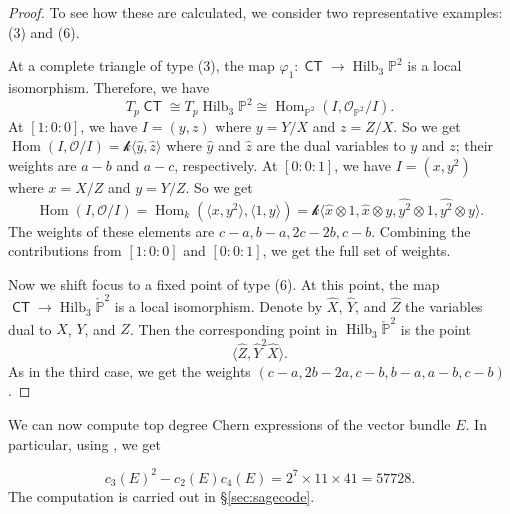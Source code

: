 \documentclass{article}
\renewcommand{\P}{\mathbb{P}}
\renewcommand{\k}{\mathscr{k}}
\DeclareMathOperator{\Hom}{Hom}
\DeclareMathOperator{\Hilb}{Hilb}
\renewcommand{\O}{\mathcal{O}}
\DeclareMathOperator{\CT}{\mathsf{CT}}
\begin{document}
\begin{proof}
To see how these are calculated, we consider two representative examples: (3) and (6).  

At a complete triangle of type (3), the
map $\varphi_{1}: \CT \to \Hilb_3 \P^2$ is a local isomorphism.
Therefore, we have
\[ T_p \CT \cong T_p \Hilb_3 \P^2 \cong \Hom_{\P^2} (I, \O_{\P^2}/I).\]
At $[1:0:0]$, we have $I = (y,z)$ where $y = Y/X$ and $z = Z/X$.  So
we get $\Hom(I, \O/I) = \k \langle \widehat y, \widehat z \rangle$
where $\widehat y$ and $\widehat z$ are the dual variables to $y$ and
$z$; their weights are $a-b$ and $a-c$, respectively.  At $[0:0:1]$,
we have $I = (x,y^2)$ where $x = X/Z$ and $y = Y/Z$.  So we get
\[\Hom(I, \O/I) = \Hom_k (\langle x, y^2 \rangle, \langle 1, y \rangle) = \k \langle \widehat x \otimes 1, \widehat x \otimes y, \widehat{y^2} \otimes 1, \widehat{y^2} \otimes y \rangle.\]
The weights of these elements are $c-a, b-a, 2c-2b, c-b$.  Combining
the contributions from $[1:0:0]$ and $[0:0:1]$, we get the full set of
weights.


Now we shift focus to a fixed point of type (6).  At this point,
the map $\CT \to \Hilb_3 \check{\P}^2$ is a local isomorphism.  Denote
by $\widehat{X}$, $\widehat{Y}$, and $\widehat{Z}$ the variables dual
to $X$, $Y$, and $Z$.  Then the corresponding point in
$\Hilb_3 \check{\P}^2$ is the point
\[ \langle \widehat{Z}, \widehat{Y}^2\widehat{X} \rangle.\] As in the
third case, we get the weights $(c-a, 2b-2a, c-b, b-a, a-b, c-b)$.

\end{proof}

We can now compute top degree Chern expressions of the vector bundle $E$. In particular, using , we get

\begin{equation}
  \label{eq:57728}
c_3(E)^2 - c_2(E)c_4(E) = 2^7 \times 11 \times 41 = 57728.
\end{equation}
The computation is carried out in \S \ref{sec:sagecode}.
\end{document}
